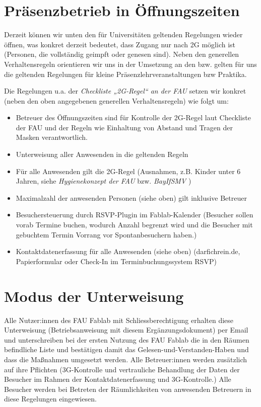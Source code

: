\documentclass[13pt]{\basedir/fablab-document}
\begin{document}
\section{Präsenzbetrieb in Öffnungszeiten}
Derzeit können wir unten den für Universitäten geltenden Regelungen wieder öffnen, was konkret derzeit bedeutet, dass Zugang nur nach 2G möglich ist (Personen, die vollständig geimpft oder genesen sind).
Neben den generellen Verhaltensregeln orientieren wir uns in der Umsetzung an den bzw. gelten für uns die geltenden Regelungen für kleine Präsenzlehrveranstaltungen bzw Praktika.


Die Regelungen u.a. der \emph{Checkliste „2G-Regel“ an der FAU} setzen wir konkret (neben den oben angegebenen generellen Verhaltensregeln) wie folgt um:
\begin{itemize}
  \item  Betreuer des Öffnungszeiten sind für Kontrolle der 2G-Regel laut Checkliste der FAU und der Regeln wie Einhaltung von Abstand und Tragen der Masken verantwortlich.
  \item  Unterweisung aller Anwesenden in die geltenden Regeln
  \item  Für alle Anwesenden gilt die 2G-Regel (Ausnahmen, z.B. Kinder unter 6 Jahren, siehe \emph{Hygienekonzept der FAU} bzw. \emph{BayIfSMV} )
  \item  Maximalzahl der anwesenden Personen (siehe oben) gilt inklusive Betreuer
  \item  Besuchersteuerung durch RSVP-Plugin im Fablab-Kalender (Besucher sollen vorab Termine buchen, wodurch Anzahl begrenzt wird und die Besucher mit gebuchtem Termin Vorrang vor Spontanbesuchern haben.)
  \item  Kontaktdatenerfassung für alle Anwesenden (siehe oben) (darfichrein.de, Papierformular oder Check-In im Terminbuchungssystem RSVP)
\end{itemize}



\section{Modus der Unterweisung}
Alle Nutzer:innen des FAU Fablab mit Schliessberechtigung erhalten diese Unterweisung (Betriebsanweisung mit diesem Ergänzungsdokument) per Email und unterschreiben bei der ersten Nutzung des FAU Fablab die in den Räumen befindliche Liste und bestätigen damit das Gelesen-und-Verstanden-Haben und dass die Maßnahmen umgesetzt werden.
Alle Betreuer:innen werden zusätzlich auf ihre Pflichten (3G-Kontrolle und vertrauliche Behandlung der Daten der Besucher im Rahmen der Kontaktdatenerfassung und 3G-Kontrolle.)
Alle Besucher werden bei Betreten der Räumlichkeiten von anwesenden Betreuern in diese Regelungen eingewiesen.

\end{document}
